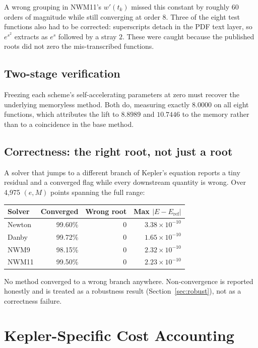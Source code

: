 \documentclass[11pt,a4paper]{article}
\begin{document}
A wrong grouping in NWM11's $w'(t_k)$ missed this constant by roughly 60
orders of magnitude while still converging at order 8. Three of the eight
test functions also had to be corrected: superscripts detach in the PDF
text layer, so $e^{s^2}$ extracts as $e^{s}$ followed by a stray $2$.
These were caught because the published roots did not zero the
mis-transcribed functions.

\subsection{Two-stage verification}

Freezing each scheme's self-accelerating parameters at zero must recover
the underlying memoryless method. Both do, measuring exactly $8.0000$ on
all eight functions, which attributes the lift to $8.8989$ and $10.7446$
to the memory rather than to a coincidence in the base method.

\subsection{Correctness: the right root, not just a root}

A solver that jumps to a different branch of Kepler's equation reports a
tiny residual and a converged flag while every downstream quantity is
wrong. Over 4{,}975 $(e,M)$ points spanning the full range:

\begin{center}
\small
\begin{tabular}{@{}lrrr@{}}
\toprule
\textbf{Solver} & \textbf{Converged} & \textbf{Wrong root} & \textbf{Max $|E-E_{\mathrm{ref}}|$} \\
\midrule
Newton & 99.60\% & 0 & $3.38\times10^{-10}$ \\
Danby  & 99.72\% & 0 & $1.65\times10^{-10}$ \\
NWM9   & 98.15\% & 0 & $2.32\times10^{-10}$ \\
NWM11  & 99.50\% & 0 & $2.23\times10^{-10}$ \\
\bottomrule
\end{tabular}
\end{center}

No method converged to a wrong branch anywhere. Non-convergence is
reported honestly and is treated as a robustness result
(Section~\ref{sec:robust}), not as a correctness failure.

\section{Kepler-Specific Cost Accounting}
\label{sec:cost}
\end{document}
